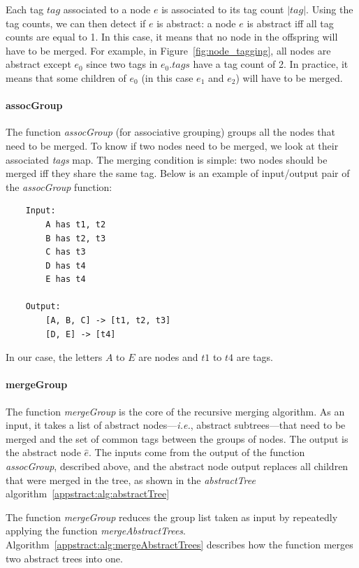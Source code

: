 Each tag $tag$ associated to a node $e$ is associated to its tag count $|tag|$.
Using the tag counts, we can then detect if $e$ is abstract: a node $e$ is abstract iff all tag counts are equal to 1.
In this case, it means that no node in the offspring will have to be merged.
For example, in Figure~\ref{fig:node_tagging}, all nodes are abstract except $e_{0}$ since two tags in $e_{0}.tags$ have a tag count of 2.
In practice, it means that some children of $e_{0}$ (in this case $e_{1}$ and $e_{2}$) will have to be merged.

\paragraph{assocGroup}\label{par:assocGroup}
The function \emph{assocGroup} (for associative grouping) groups all the nodes that need to be merged.
To know if two nodes need to be merged, we look at their associated \emph{tags} map.
The merging condition is simple: two nodes should be merged iff they share the same tag.
Below is an example of input/output pair of the \emph{assocGroup} function:
\begin{lstlisting}
    Input:
        A has t1, t2
        B has t2, t3
        C has t3
        D has t4
        E has t4

    Output:
        [A, B, C] -> [t1, t2, t3]
        [D, E] -> [t4]
\end{lstlisting}

In our case, the letters $A$ to $E$ are nodes and $t1$ to $t4$ are tags.

\paragraph{mergeGroup}\label{par:mergeGroup}
The function \emph{mergeGroup} is the core of the recursive merging algorithm.
As an input, it takes a list of abstract nodes---\emph{i.e.}, abstract subtrees---that need to be merged and the set of common tags between the groups of nodes.
The output is the abstract node $\hat{e}$.
The inputs come from the output of the function \emph{assocGroup}, described above, and the abstract node output replaces all children that were merged in the tree, as shown in the \emph{abstractTree} algorithm~\ref{appstract:alg:abstractTree}

The function \emph{mergeGroup} reduces the group list taken as input by repeatedly applying the function \emph{mergeAbstractTrees}.
Algorithm~\ref{appstract:alg:mergeAbstractTrees} describes how the function merges two abstract trees into one.

